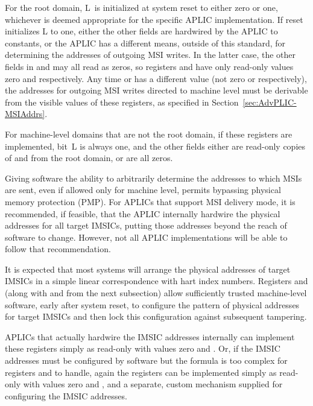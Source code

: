 For the root domain, L~is initialized at
system reset to either zero or one, whichever is
deemed appropriate for the specific APLIC implementation.
If reset initializes L to one, either the other fields are
hardwired by the APLIC to constants, or the APLIC has a different means,
outside of this standard, for determining the addresses of outgoing MSI
writes.
In the latter case, the other fields in  and
 may all read as zeros, so registers  and
 have only read-only values zero and 
respectively.
Any time  or  has a different value
(not zero or  respectively), the addresses for
outgoing MSI writes directed to machine level must be derivable
from the visible values of these registers, as specified in
Section~\ref{sec:AdvPLIC-MSIAddrs}.

For machine-level domains that are not the root domain, if these
registers are implemented, bit~L is always one, and the other
fields either are read-only copies of  and
 from the root domain, or are all zeros.

\begin{commentary}
Giving software the ability to arbitrarily determine the addresses to
which MSIs are sent, even if allowed only for machine level, permits
bypassing physical memory protection (PMP).
For APLICs that support MSI delivery mode, it is recommended, if
feasible, that the APLIC internally hardwire the physical addresses for
all target IMSICs, putting those addresses beyond the reach of software
to change.
However, not all APLIC implementations will be able to follow that
recommendation.

It is expected that most systems will arrange the
physical addresses of target IMSICs in a simple
linear correspondence with hart index numbers.
Registers  and  (along with
 and  from the next subsection) allow
sufficiently trusted machine-level software, early after system reset,
to configure the pattern of physical addresses for target IMSICs and
then lock this configuration against subsequent tampering.

APLICs that actually hardwire the IMSIC addresses internally
can implement these registers simply as read-only with values zero
and .
Or, if the IMSIC addresses must be configured by software but
the formula is too complex for registers  and
 to handle, again the registers can be implemented
simply as read-only with values zero and , and a
separate, custom mechanism supplied for configuring the IMSIC
addresses.
\end{commentary}

